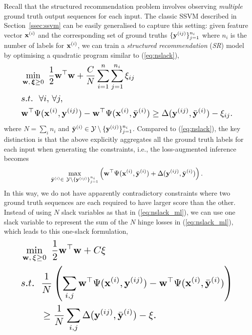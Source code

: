 Recall that the structured recommendation problem
involves observing \emph{multiple} ground truth output sequences for each input.
The classic SSVM described in Section~\ref{ssec:ssvm} can be easily generalised to capture this setting:
given feature vector $\mathbf{x}^{(i)}$ and the corresponding set of ground truths $\{\mathbf{y}^{(ij)}\}_{j=1}^{n_i}$
where $n_i$ is the number of labels for $\mathbf{x}^{(i)}$,
we can train a \emph{structured recommendation} (\emph{SR}) model by optimising a quadratic program similar to (\ref{eq:nslack}),
\begin{equation}
\label{eq:nslack_ml}
\resizebox{0.9\linewidth}{!}{$
\begin{aligned}
&\min_{\w, \, \bm{\xi} \ge 0} ~ \frac{1}{2} \w^\top \w + \frac{C}{N} \sum_{i=1}^n \sum_{j=1}^{n_i} \xi_{ij} \\
&s.t.~~ \forall i, \, \forall j, \\
& \w^\top \Psi(\x^{(i)}, \y^{(ij)}) - \w^\top \Psi(\x^{(i)}, \bar{\y}^{(i)}) \ge
  \Delta(\y^{(ij)}, \bar{\y}^{(i)}) - \xi_{ij}.
\end{aligned}
$}
\end{equation}
where $N = \sum_i n_i$ and $\bar{\mathbf{y}}^{(i)} \in \mathcal{Y} \setminus \{\mathbf{y}^{(ij)}\}_{j=1}^{n_i}$.
Compared to (\ref{eq:nslack}), the key distinction is that the above
explicitly aggregates all the ground truth labels for each input when generating the constraints,
i.e., the loss-augmented inference becomes
\begin{equation}
\label{eq:loss_aug_inf}
\max_{\bar{\mathbf{y}}^{(i)} \in \ \mathcal{Y} \setminus \{\mathbf{y}^{(ij)}\}_{j=1}^{n_i}}
     \left( \mathbf{w}^\top \Psi(\mathbf{x}^{(i)}, \bar{\mathbf{y}}^{(i)}) + \Delta(\mathbf{y}^{(ij)}, \bar{\mathbf{y}}^{(i)}) \right).
\end{equation}
In this way, we do not have apparently contradictory constraints where
two ground truth sequences are each required to have larger score than the other.
Instead of using $N$ slack variables as that in (\ref{eq:nslack_ml}),
we can use one slack variable to represent the sum of the $N$ hinge losses in (\ref{eq:nslack_ml}),
which leads to this one-slack formulation,
\begin{equation}
\label{eq:1slack_ml}
\resizebox{0.9\linewidth}{!}{$
\begin{aligned}
& \min_{\w, \, \xi \ge 0} ~\frac{1}{2} \w^\top \w + C \xi \\
& s.t.~~ \frac{1}{N} \left( \sum_{i,j} \w^\top \Psi(\x^{(i)}, \y^{(ij)}) - \w^\top \Psi(\x^{(i)}, \bar{\y}^{(i)}) \right) \\
& \hspace{2em} \ge \frac{1}{N} \sum_{i,j} \Delta(\y^{(ij)}, \bar{\y}^{(i)}) - \xi.
\end{aligned}
$}
\end{equation}

